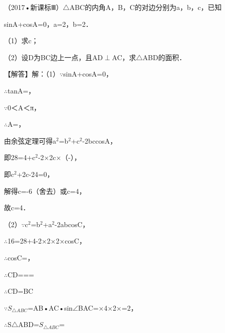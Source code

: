 \begin{question}
（2017•新课标Ⅲ）$\triangle$ABC的内角A，B，C的对边分别为a，b，c，已知\par
sinA+\allowbreak{}cosA=0，a=2\allowbreak{}，b=2．\par
（1）求c；\par
（2）设D为BC边上一点，且AD$\perp$AC，求$\triangle$ABD的面积．\par
\begin{solution}
【解答】解：（1）$\because$sinA+\allowbreak{}cosA=0，\par
$\therefore$tanA=\allowbreak{}，\par
$\because$0＜A＜π，\par
$\therefore$A=\allowbreak{}，\par
由余弦定理可得a$^{2}$=b$^{2}$+c$^{2}$-2bccosA，\par
即28=4+c$^{2}$-2×2c×（-\allowbreak{}），\par
即c$^{2}$+2c-24=0，\par
解得c=-6（舍去）或c=4，\par
故c=4．\par
（2）$\because$c$^{2}$=b$^{2}$+a$^{2}$-2abcosC，\par
$\therefore$16=28+4-2×2\allowbreak{}×2×cosC，\par
$\therefore$cosC=\allowbreak{}，\par
$\therefore$CD=\allowbreak{}=\allowbreak{}=\allowbreak{}\par
$\therefore$CD=\allowbreak{}BC\par
$\because$$S_{\triangle ABC}$=\allowbreak{}AB•AC•sin$\angle$BAC=\allowbreak{}×4×2×\allowbreak{}=2\allowbreak{}，\par
$\therefore$S$\triangle$ABD=\allowbreak{}$S_{\triangle ABC}$=\allowbreak{}\par
\begin{center}
\allowbreak{}
\end{center}
\end{solution}
\end{question}

